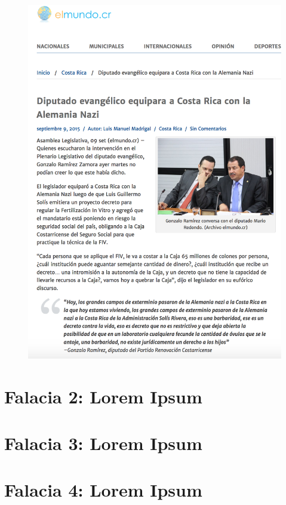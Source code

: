 \documentclass[times]{simauth}
\begin{document}
\newpage
\begin{figure}[h]
    \centering
    \includegraphics[width=15cm]{costarica-nazi-fiv}
    \label{fig:falacia1}
\end{figure}


\section{Falacia 2: Lorem Ipsum}

\section{Falacia 3: Lorem Ipsum}

\section{Falacia 4: Lorem Ipsum}
\end{document}
